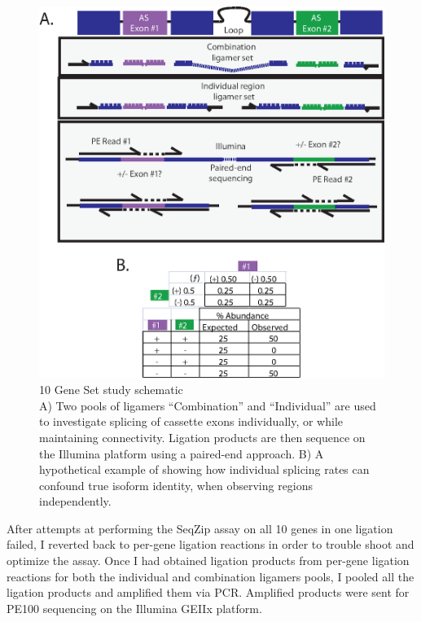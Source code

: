   \begin{figure} %
    \centering 
    \includegraphics{Figures/SeqZipMethod/10GeneSetSchematic.eps}
    \caption[10 Gene Set study schematic]
    {
      10 Gene Set study schematic\\[0.25cm]
      A) Two pools of ligamers ``Combination'' and ``Individual'' are used to investigate splicing of cassette exons individually, or while maintaining connectivity. Ligation products are then sequence on the Illumina platform using a paired-end approach. B) A hypothetical example of showing how individual splicing rates can confound true isoform identity, when observing regions independently.
	    }
    \label{SeqZipMethod:fig:Multiplex Study Design}
  	\end{figure}

  After attempts at performing the SeqZip assay on all 10 genes in one ligation failed, I reverted back to per-gene ligation reactions in order to trouble shoot and optimize the assay. Once I had obtained ligation products from per-gene ligation reactions for both the individual and combination ligamers pools, I pooled all the ligation products and amplified them via PCR. Amplified products were sent for PE100 sequencing on the Illumina GEIIx platform. 

